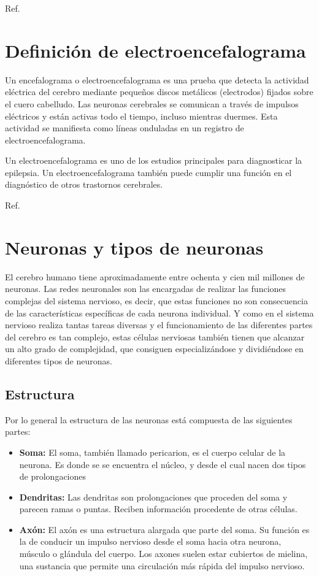 \documentclass[oneside,openright,titlepage,numbers=noenddot,openany,headinclude,footinclude=true,
cleardoublepage=empty,abstractoff,BCOR=5mm,paper=a4,fontsize=12pt,main=spanish]{scrreprt}
\begin{document}
 Ref. \cite{introduccionneurociencia}

\section{Definición de electroencefalograma}\label{part:encefal}

Un encefalograma o electroencefalograma es una prueba que detecta la actividad eléctrica del cerebro mediante pequeños discos metálicos (electrodos) fijados sobre el cuero cabelludo. Las neuronas cerebrales se comunican a través de impulsos eléctricos y están activas todo el tiempo, incluso mientras duermes. Esta actividad se manifiesta como líneas onduladas en un registro de electroencefalograma.

Un electroencefalograma es uno de los estudios principales para diagnosticar la epilepsia. Un electroencefalograma también puede cumplir una función en el diagnóstico de otros trastornos cerebrales.

Ref. \cite{EEG}

\section{Neuronas y tipos de neuronas}\label{part:neuronas}

El cerebro humano tiene aproximadamente entre ochenta y cien mil millones de neuronas. Las redes neuronales son las encargadas de realizar las funciones complejas del sistema nervioso, es decir, que estas funciones no son consecuencia de las características específicas de cada neurona individual. Y como en el sistema nervioso realiza tantas tareas diversas y el funcionamiento de las diferentes partes del cerebro es tan complejo, estas células nerviosas también tienen que alcanzar un alto grado de complejidad, que consiguen especializándose y dividiéndose en diferentes tipos de neuronas.

\subsection{Estructura}\label{part:estructuraneurona}

Por lo general la estructura de las neuronas está compuesta de las siguientes partes:

\begin{itemize}
    \item \textbf{Soma:} El soma, también llamado pericarion, es el cuerpo celular de la neurona. Es donde se se encuentra el núcleo, y desde el cual nacen dos tipos de prolongaciones
    
    \item \textbf{Dendritas:} Las dendritas son prolongaciones que proceden del soma y parecen ramas o puntas. Reciben información procedente de otras células.
    
    \item \textbf{Axón:} El axón es una estructura alargada que parte del soma. Su función es la de conducir un impulso nervioso desde el soma hacia otra neurona, músculo o glándula del cuerpo. Los axones suelen estar cubiertos de mielina, una sustancia que permite una circulación más rápida del impulso nervioso.
\end{itemize}
\end{document}
